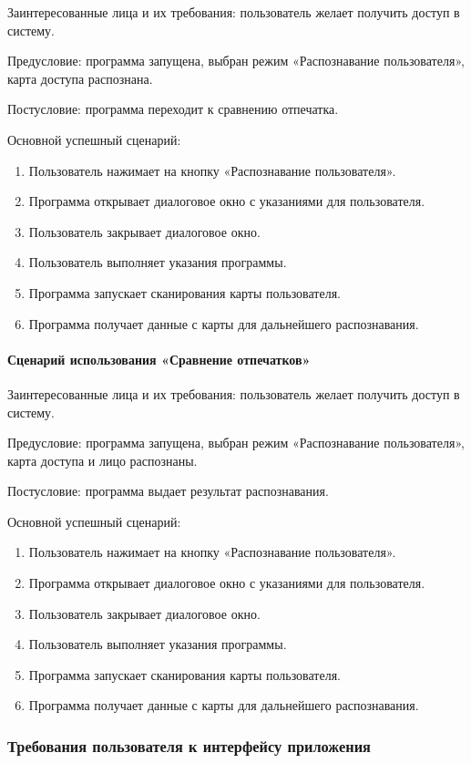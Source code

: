 Заинтересованные лица и их требования: пользователь желает получить доступ в систему.

Предусловие: программа запущена, выбран режим «Распознавание пользователя», карта доступа распознана.

Постусловие: программа переходит к сравнению отпечатка.

Основной успешный сценарий:
\begin{enumerate}
	\item Пользователь нажимает на кнопку «Распознавание пользователя».
	\item Программа открывает диалоговое окно с указаниями для пользователя.
	\item Пользователь закрывает диалоговое окно.
	\item Пользователь выполняет указания программы.
	\item Программа запускает сканирования карты пользователя.
	\item Программа получает данные с карты для дальнейшего распознавания.
\end{enumerate}

\paragraph{Сценарий использования «Сравнение отпечатков»}

Заинтересованные лица и их требования: пользователь желает получить доступ в систему.

Предусловие: программа запущена, выбран режим «Распознавание пользователя», карта доступа и лицо распознаны.

Постусловие: программа выдает результат распознавания.

Основной успешный сценарий:
\begin{enumerate}
	\item Пользователь нажимает на кнопку «Распознавание пользователя».
	\item Программа открывает диалоговое окно с указаниями для пользователя.
	\item Пользователь закрывает диалоговое окно.
	\item Пользователь выполняет указания программы.
	\item Программа запускает сканирования карты пользователя.
	\item Программа получает данные с карты для дальнейшего распознавания.
\end{enumerate}


\subsubsection{Требования пользователя к интерфейсу приложения}

